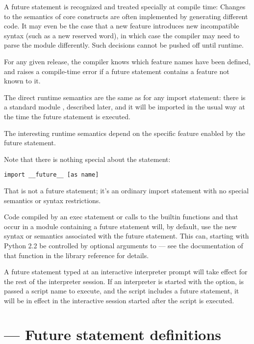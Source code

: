 A future statement is recognized and treated specially at compile
time: Changes to the semantics of core constructs are often
implemented by generating different code.  It may even be the case
that a new feature introduces new incompatible syntax (such as a new
reserved word), in which case the compiler may need to parse the
module differently.  Such decisions cannot be pushed off until
runtime.

For any given release, the compiler knows which feature names have been
defined, and raises a compile-time error if a future statement contains
a feature not known to it.

The direct runtime semantics are the same as for any import statement:
there is a standard module , described later, and
it will be imported in the usual way at the time the future statement
is executed.

The interesting runtime semantics depend on the specific feature
enabled by the future statement.

Note that there is nothing special about the statement:

\begin{verbatim}
import __future__ [as name]
\end{verbatim}

That is not a future statement; it's an ordinary import statement with
no special semantics or syntax restrictions.

Code compiled by an exec statement or calls to the builtin functions
 and  that occur in a module
 containing a future statement will, by default, use the new 
syntax or semantics associated with the future statement.  This can,
starting with Python 2.2 be controlled by optional arguments to
 --- see the documentation of that function in the 
library reference for details.

A future statement typed at an interactive interpreter prompt will
take effect for the rest of the interpreter session.  If an
interpreter is started with the  option, is passed a
script name to execute, and the script includes a future statement, it
will be in effect in the interactive session started after the script
is executed.

\section{ ---
         Future statement definitions}

